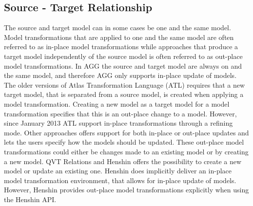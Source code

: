 \subsection{Source - Target Relationship}


The source and target model can in some cases be one and the same model.
Model transformations that are applied to one and the same model are often
referred to as in-place model transformations while approaches that produce a
target model independently of the source model is often referred to as
out-place model transformations. In AGG the source and target model are always
on and the same model, and therefore AGG only supports in-place update of
models. The older versions of Atlas Transformation Language (ATL) requires that
a new target model, that is separated from a source model, is created when
applying a model transformation. Creating a new model as a target model for a
model transformation specifies that this is an out-place change to a model.
However, since January 2013 ATL support in-place transformations through a refining
mode. Other approaches offers support for both in-place or out-place updates
and lets the users specify how the models should be updated. These out-place
model transformations could either be changes made to an existing model or by
creating a new model. QVT Relations and Henshin offers the possibility to create
a new model or update an existing one. Henshin does implicitly deliver an
in-place model transformation environment, that allows for in-place update of
models. However, Henshin provides out-place model transformations explicitly
when using the Henshin API.

